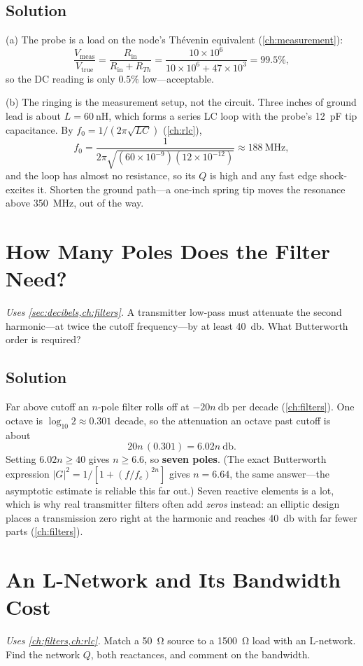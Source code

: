 \subsection*{Solution}
(a) The probe is a load on the node's Th\'evenin equivalent
(\cref{ch:measurement}):
\[
\frac{V_{\text{meas}}}{V_{\text{true}}}=\frac{R_{\mathrm{in}}}{R_{\mathrm{in}}+R_{Th}}
=\frac{10\times10^6}{10\times10^6+47\times10^3}=99.5\%,
\]
so the DC reading is only \(0.5\%\) low---acceptable.

(b) The ringing is the measurement setup, not the circuit. Three inches of ground lead
is about \(L=\SI{60}{\nano\henry}\), which forms a series LC loop with the probe's
\SI{12}{\pico\farad} tip capacitance. By \(f_0=1/(2\pi\sqrt{LC})\)
(\cref{ch:rlc}),
\[
f_0=\frac{1}{2\pi\sqrt{(60\times10^{-9})(12\times10^{-12})}}\approx\SI{188}{\mega\hertz},
\]
and the loop has almost no resistance, so its \(Q\) is high and any fast edge
shock-excites it. Shorten the ground path---a one-inch spring tip moves the resonance
above \SI{350}{\mega\hertz}, out of the way.

\section{How Many Poles Does the Filter Need?}
\emph{Uses \cref{sec:decibels,ch:filters}.} A transmitter low-pass must attenuate the
second harmonic---at twice the cutoff frequency---by at least \SI{40}{\decibel}. What
Butterworth order is required?

\subsection*{Solution}
Far above cutoff an \(n\)-pole filter rolls off at \(-20n\ \si{\decibel}\) per decade
(\cref{ch:filters}). One octave is \(\log_{10}2\approx0.301\) decade, so the
attenuation an octave past cutoff is about
\[
20n\,(0.301)=6.02n\ \si{\decibel}.
\]
Setting \(6.02n\ge40\) gives \(n\ge6.6\), so \textbf{seven poles}. (The exact
Butterworth expression \(|G|^2=1/[1+(f/f_c)^{2n}]\) gives \(n=6.64\), the same
answer---the asymptotic estimate is reliable this far out.) Seven reactive elements is
a lot, which is why real transmitter filters often add \emph{zeros} instead: an
elliptic design places a transmission zero right at the harmonic and reaches
\SI{40}{\decibel} with far fewer parts (\cref{ch:filters}).

\section{An L-Network and Its Bandwidth Cost}
\emph{Uses \cref{ch:filters,ch:rlc}.} Match a \SI{50}{\ohm}
source to a \SI{1500}{\ohm} load with an L-network. Find the network \(Q\), both
reactances, and comment on the bandwidth.

